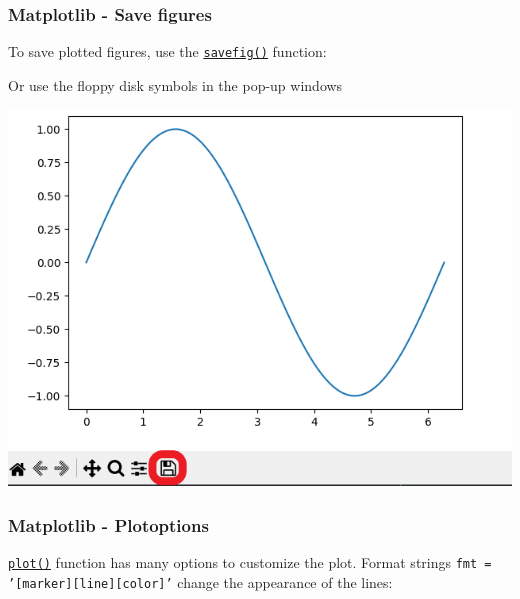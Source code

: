 \documentclass{beamer}
\newcommand{\hrefu}[2]{\underline{\href{#1}{#2}}}
\begin{document}
\begin{frame}
  \frametitle{Matplotlib - Save figures}
  To save plotted figures, use the \hrefu{https://matplotlib.org/stable/api/_as_gen/matplotlib.pyplot.savefig.html}{\texttt{savefig()}} function:
  

\begin{minipage}[t]{0.35\textwidth}
    \vspace{-3.5cm}
    Or use the floppy disk symbols in the pop-up windows
\end{minipage}
\hfill
\begin{minipage}[t]{0.6\textwidth}
    \centering
    \includegraphics[width=\linewidth]{fig/Saveplot.png}
\end{minipage}
\end{frame}

\begin{frame}
  \frametitle{Matplotlib - Plotoptions}
  \hrefu{https://matplotlib.org/stable/api/_as_gen/matplotlib.pyplot.plot.html}{\texttt{plot()}} function has many options to customize the plot. Format strings \texttt{fmt = '[marker][line][color]'} change the appearance of the lines:\\
  
\end{frame}
\end{document}
